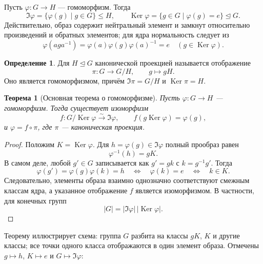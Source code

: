 \documentclass[12pt,a4paper,oneside,openany]{book}
\theoremstyle{definition}
\newtheorem{definition}{Определение}[chapter]
\theoremstyle{plain}
\newtheorem{theorem}{Теорема}[chapter]
\theoremstyle{remark}
\DeclareMathOperator{\Ker}{Ker}
\begin{document}
Пусть $\varphi\colon G\to H$ --- гомоморфизм. Тогда
\[
  \Im\varphi=\{\varphi(g)\mid g\in G\}\leq H,
  \qquad
  \Ker\varphi=\{g\in G\mid\varphi(g)=e\}\trianglelefteq G.
\]
Действительно, образ содержит нейтральный элемент и замкнут относительно
произведений и обратных элементов; для ядра нормальность следует из
\[
  \varphi(aga^{-1})=
  \varphi(a)\varphi(g)\varphi(a)^{-1}=e
  \quad(g\in\Ker\varphi).
\]


\begin{definition}
Для $H\trianglelefteq G$ канонической проекцией называется отображение
\[
  \pi\colon G\to G/H,
  \qquad g\mapsto gH.
\]
Оно является гомоморфизмом, причём $\Im\pi=G/H$ и $\Ker\pi=H$.
\end{definition}

\begin{theorem}[Основная теорема о гомоморфизме]
Пусть $\varphi\colon G\to H$ --- гомоморфизм. Тогда существует
изоморфизм
\[
  f\colon G/\Ker\varphi\xrightarrow{\sim}\Im\varphi,
  \qquad
  f(g\Ker\varphi)=\varphi(g),
\]
и $\varphi=f\circ\pi$, где $\pi$ --- каноническая проекция.
\end{theorem}

\begin{proof}
Положим $K=\Ker\varphi$. Для $h=\varphi(g)\in\Im\varphi$ полный
прообраз равен
\[
  \varphi^{-1}(h)=gK.
\]
В самом деле, любой $g'\in G$ записывается как $g'=gk$ с
$k=g^{-1}g'$. Тогда
\[
  \varphi(g')=\varphi(g)\varphi(k)=h
  \quad\Longleftrightarrow\quad
  \varphi(k)=e
  \quad\Longleftrightarrow\quad k\in K.
\]
Следовательно, элементы образа взаимно однозначно соответствуют смежным
классам ядра, а указанное отображение $f$ является изоморфизмом.
В частности, для конечных групп
\[
  |G|=|\Im\varphi|\,|\Ker\varphi|.
\]
\end{proof}

Теорему иллюстрирует схема: группа \(G\) разбита на классы \(gK\), \(K\)
и другие классы; все точки одного класса отображаются в один элемент
образа. Отмечены \(g\mapsto h\), \(K\mapsto e\) и
\(G\mapsto\Im\varphi\):

\begin{center}
\end{center}
\end{document}
